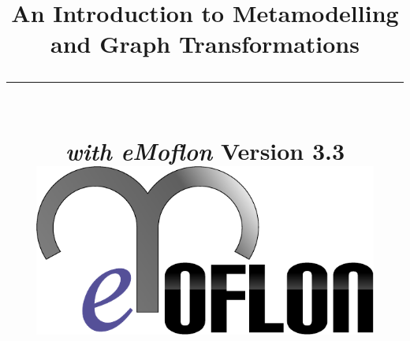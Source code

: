 \title{
\flushright
{\LARGE\bfseries An Introduction to Metamodelling\\
and Graph Transformations}
\noindent\rule[-1ex]{\textwidth}{5pt}\\[2.5ex]
\hfill\emph{\LARGE\bfseries with eMoflon}
\flushleft
{\small Version 3.3}
\flushright
\includegraphics[width=0.85\textwidth]{pics/eMoflon3} 
}

\date{}  
\author{} 